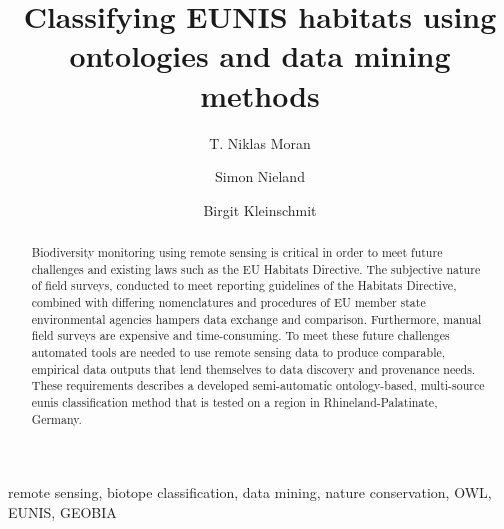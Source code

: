 \documentclass[authoryear,preprint,12pt,number]{elsarticle}
\begin{document}
\tableofcontents

\printglossary

%

\begin{frontmatter}
\title{Classifying EUNIS habitats using ontologies and data mining 
methods}

\author[TUB]{T. Niklas Moran}

\author[TUB]{Simon Nieland}
\author[TUB]{Birgit Kleinschmit}

\address[TUB]{Geoinformation in Environmental Planning Lab, Technische
Universit\"at Berlin, Stra\ss e des 17. Juni 145, 10623 Berlin, Germany}


\begin{abstract}
Biodiversity monitoring using remote sensing is critical in order to 
meet future challenges and existing laws such as the EU Habitats Directive. The 
subjective nature of field surveys, conducted to meet reporting guidelines of  
the Habitats Directive, combined with differing nomenclatures and procedures 
of EU member state environmental agencies hampers data exchange and comparison. 
Furthermore, manual field surveys are expensive and time-consuming. To meet 
these future challenges automated tools are needed to use remote 
sensing data to produce comparable, empirical data outputs that lend 
themselves to data discovery and provenance needs. These requirements describes 
a developed semi-automatic ontology-based, multi-source \gls{eunis} 
classification 
method that is tested on a region in Rhineland-Palatinate, Germany. 
\end{abstract}

\begin{keyword}
remote sensing, biotope classification, data mining, nature conservation, OWL, 
EUNIS, GEOBIA 
\end{keyword}
\end{frontmatter}
\end{document}
